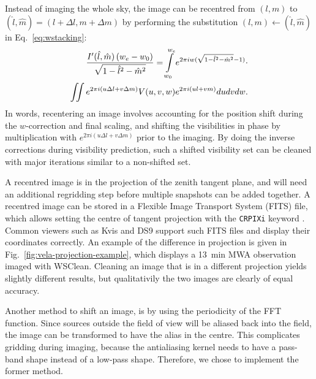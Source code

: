 \documentclass[useAMS,usenatbib]{mn2e}
\begin{document}
Instead of imaging the whole sky, the image can be recentred from $(l,m)$ to $(\hat{l},\hat{m})=(l+\Delta l,m+\Delta m)$ by performing the substitution $(l,m)\leftarrow(\hat{l},\hat{m})$ in Eq.~\eqref{eq:wstacking}:
\begin{align}\notag
\frac{I'(\hat{l}, \hat{m})\left(w_e - w_0\right)}{\sqrt{1-\hat{l}^2-\hat{m}^2}} = \int\limits_{w_0}^{w_e} e^{2\pi i w(\sqrt{1-\hat{l}^2-\hat{m}^2}-1)} \cdot \\
\iint e^{2 \pi i \left(u\Delta l + v\Delta m\right)} V(u,v,w) e^{2\pi i \left(ul + vm\right)} du dv dw.
\end{align}
In words, recentering an image involves accounting for the position shift during the $w$-correction and final scaling, and shifting the visibilities in phase by multiplication with $e^{2 \pi i \left(u\Delta l + v\Delta m\right)}$ prior to the imaging. By doing the inverse corrections during visibility prediction, such a shifted visibility set can be cleaned with major iterations similar to a non-shifted set.

A recentred image is in the projection of the zenith tangent plane, and will need an additional regridding step before multiple snapshots can be added together. A recentred image can be stored in a Flexible Image Transport System (FITS) file, which allows setting the centre of tangent projection with the \texttt{CRPIXi} keyword \citep{wcs-in-fits}. Common viewers such as Kvis and DS9 support such FITS files and display their coordinates correctly. An example of the difference in projection is given in Fig.~\ref{fig:vela-projection-example}, which displays a 13~min MWA observation imaged with WSClean. Cleaning an image that is in a different projection yields slightly different results, but qualitativily the two images are clearly of equal accuracy.

Another method to shift an image, is by using the periodicity of the FFT function. Since sources outside the field of view will be aliased back into the field, the image can be transformed to have the alias in the centre. This complicates gridding during imaging, because the antialiasing kernel needs to have a pass-band shape instead of a low-pass shape. Therefore, we chose to implement the former method.
\end{document}
